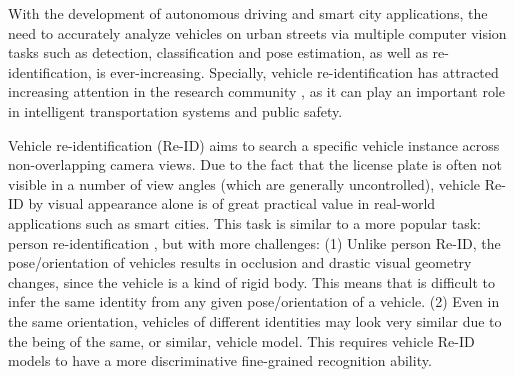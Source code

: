 \documentclass[10pt,twocolumn,letterpaper]{article}
\begin{document}

With the development of autonomous driving
and smart city applications, the need to accurately analyze vehicles on urban streets
via multiple computer vision tasks such as detection, classification and
pose estimation, as well as re-identification, is ever-increasing.
%
Specially, vehicle re-identification has attracted increasing attention in the research community
\cite{liu2016vehicleid,liu2016veri,liu2016veri,
wang2017orientation,Wang_2017_ICCV,Zhou2018VAMI},
as it can play an important role in
intelligent transportation systems and public safety.

Vehicle re-identification (Re-ID) aims to search a specific vehicle
instance across non-overlapping camera views.
%
Due to the fact that the license plate is often not visible in a number of view angles (which are generally uncontrolled),
vehicle Re-ID by visual appearance alone is of great practical value in real-world applications such as smart cities.
%
This task is similar to a more popular task: person re-identification
\cite{gong2014re,chen2018person,Li2018Harmonious,xiao2016learning,
li2017person,wei2018person,song2018mask,chang2018multi,
shen2018deep,zhang2017deep,shen2018person,suh2018part},
but with more challenges:
(1) Unlike person Re-ID, the pose/orientation of vehicles results in occlusion and drastic visual geometry changes, since the vehicle is a kind of rigid body.
This means that is difficult to infer the same identity from any given pose/orientation of a vehicle.
(2) Even in the same orientation, vehicles of different identities may look very similar
due to the being of the same, or similar, vehicle model. This requires vehicle Re-ID models
to have a more discriminative fine-grained recognition ability.
\end{document}

